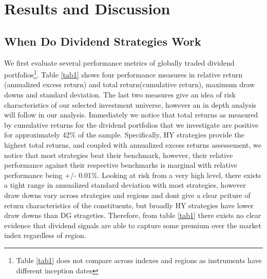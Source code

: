\documentclass[11pt,preprint, authoryear]{elsarticle}
\numberwithin{equation}{section}
\numberwithin{figure}{section}
\numberwithin{table}{section}
\let\rmarkdownfootnote\footnote%
\def\footnote{\protect\rmarkdownfootnote}
\begin{document}
\hypertarget{results-and-discussion}{%
\section*{Results and Discussion}\label{results-and-discussion}}

\hypertarget{when-do-dividend-strategies-work}{%
\subsection*{When Do Dividend Strategies
Work}\label{when-do-dividend-strategies-work}}

We first evaluate several performance metrics of globally traded
dividend portfolios\footnote{ Table \ref{tab1} does not compare across
  indexes and regions as instruments have different inception dates}.
Table \ref{tab1} shows four performance measures in relative return
(annualized excess return) and total return(cumulative return), maximum
draw downs and standard deviation. The last two measures give an idea of
risk characteristics of our selected investment universe, however an in
depth analysis will follow in our analysis. Immediately we notice that
total returns as measured by cumulative returns for the dividend
portfolios that we investigate are positive for approximately 42\% of
the sample. Specifically, HY strategies provide the highest total
returns, and coupled with annualized excess returns assessement, we
notice that most strategies beat their benchmark, however, their
relative performance against their respective benchmarks is marginal
with relative performance being +/- 0.01\%. Looking at risk from a very
high level, there exists a tight range in annualized standard deviation
with most strategies, however draw downs vary across strategies and
regions and dont give a clear pciture of return characteristics of the
constituents, but broadly HY strategies have lower draw downs than DG
strageties. Therefore, from table \ref{tab1} there exists no clear
evidence that dividend signals are able to capture some premium over the
market index regardless of region.
\end{document}

